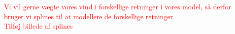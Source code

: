 \textcolor{red}{Vi vil gerne vægte vores vind i forskellige retninger i vores model, så derfor bruger vi splines til at modellere de forskellige retninger.} \\

\textcolor{red}{Tilføj billede af splines}



